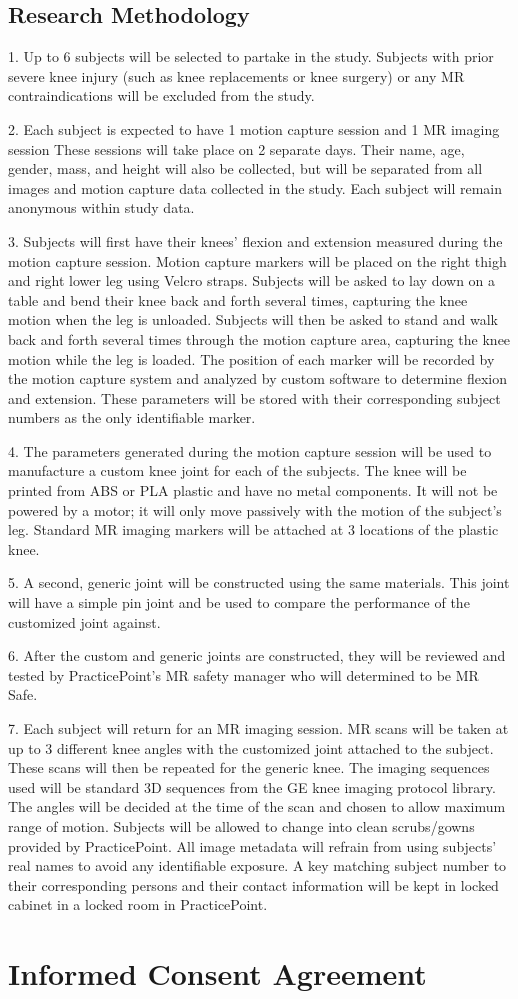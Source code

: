 \subsection{Research Methodology}

1. Up to 6 subjects will be selected to partake in the study. Subjects with prior severe knee injury (such as knee replacements or knee surgery) or any MR contraindications will be excluded from the study.  

2. Each subject is expected to have 1 motion capture session and 1 MR imaging session These sessions will take place on 2 separate days. Their name, age, gender, mass, and height will also be collected, but will be separated from all images and motion capture data collected in the study. Each subject will remain anonymous within study data. 

3. Subjects will first have their knees’ flexion and extension measured during the motion capture session. Motion capture markers will be placed on the right thigh and right lower leg using Velcro straps. Subjects will be asked to lay down on a table and bend their knee back and forth several times, capturing the knee motion when the leg is unloaded. Subjects will then be asked to stand and walk back and forth several times through the motion capture area, capturing the knee motion while the leg is loaded. The position of each marker will be recorded by the motion capture system and analyzed by custom software to determine flexion and extension. These parameters will be stored with their corresponding subject numbers as the only identifiable marker. 

4. The parameters generated during the motion capture session will be used to manufacture a custom knee joint for each of the subjects. The knee will be printed from ABS or PLA plastic and have no metal components. It will not be powered by a motor; it will only move passively with the motion of the subject’s leg. Standard MR imaging markers will be attached at 3 locations of the plastic knee.  

5. A second, generic joint will be constructed using the same materials. This joint will have a simple pin joint and be used to compare the performance of the customized joint against. 

6. After the custom and generic joints are constructed, they will be reviewed and tested by PracticePoint’s MR safety manager who will determined to be MR Safe. 

7. Each subject will return for an MR imaging session. MR scans will be taken at up to 3 different knee angles with the customized joint attached to the subject. These scans will then be repeated for the generic knee. The imaging sequences used will be standard 3D sequences from the GE knee imaging protocol library. The angles will be decided at the time of the scan and chosen to allow maximum range of motion. Subjects will be allowed to change into clean scrubs/gowns provided by PracticePoint. All image metadata will refrain from using subjects’ real names to avoid any identifiable exposure. A key matching subject number to their corresponding persons and their contact information will be kept in locked cabinet in a locked room in PracticePoint. 

\section{Informed Consent Agreement}
